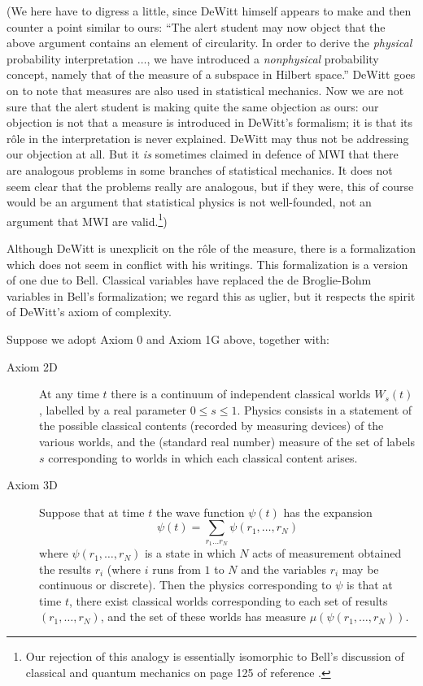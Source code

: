 \documentclass[aps,pra,12pt]{revtex4}
\begin{document}
(We here have to digress a little, since DeWitt himself appears to make
and then counter a point similar to ours: ``The alert student may now
object that the above argument contains an element of circularity. In
order to derive the {\em physical} probability interpretation
$\ldots$, we have introduced a {\em nonphysical} probability concept,
namely that of the measure of a subspace in Hilbert space.''  DeWitt
goes on to note that measures are also used in statistical mechanics.
Now we are not sure that the alert student is making quite the same
objection as ours: our objection is not that a measure is introduced
in DeWitt's formalism; it is that its r\^{o}le in the interpretation is
never explained.  DeWitt may thus not be addressing our objection at
all.  But it {\em is} sometimes claimed in defence of MWI that there are 
analogous problems in some branches of statistical mechanics.
It does not seem clear that the problems really are analogous,
but if they were, this of course would be an argument 
that statistical physics is not well-founded, not an argument that  
MWI are valid.\footnote{Our rejection of this analogy is essentially 
isomorphic to Bell's discussion
of classical and quantum mechanics on page 125 of reference \cite{bell2}.})

Although DeWitt is unexplicit on the r\^{o}le of the measure, there is
a formalization which does not seem in conflict with his writings. 
This formalization is a version of one due to Bell.\cite{bell1,bell2}
Classical variables have replaced the de Broglie-Bohm variables
in Bell's formalization; we regard this as uglier, but it respects the
spirit of DeWitt's axiom of complexity. 

Suppose we adopt Axiom 0 and Axiom 1G above, together with:
\begin{description}
\item[Axiom 2D] At any time $t$ there 
is a continuum of independent classical worlds 
$W_s (t)$, labelled by a real parameter $0 \leq s \leq 1$.
Physics consists in a statement of the possible classical contents (recorded by
measuring devices) of the various worlds, and the (standard real number)
measure of the set of labels $s$ corresponding to worlds
in which each classical content arises. 

\item[Axiom 3D] Suppose that at time $t$ the 
wave function $\psi(t)$ has the expansion 
\begin{equation}
\psi(t) = \sum_{r_1 \ldots r_N  }  \psi (r_1 , \ldots , r_N )
\end{equation}
where $\psi (r_1 , \ldots , r_N )$ is a state in which $N$ acts of measurement
obtained the results $r_i$ (where $i$ runs from $1$ to $N$ and the variables
$r_i$ may be continuous or discrete). 
Then the physics corresponding to $\psi$ is that at time $t$, there exist 
classical worlds corresponding to each set of results $(r_1 , \ldots , r_N )$,
and the set of these worlds has measure $\mu (\psi (r_1 , \ldots , r_N ))$. 
\end{description}
\end{document}
